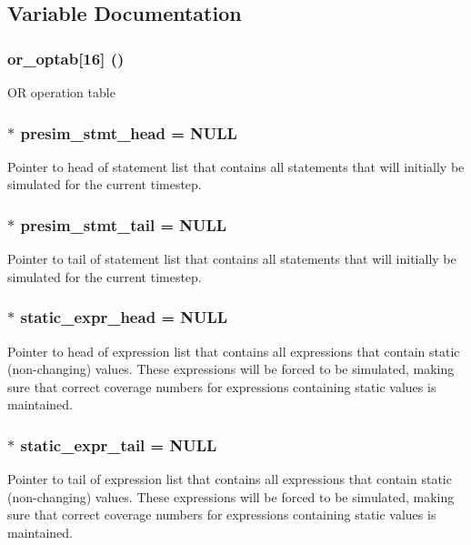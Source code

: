 \subsection{Variable Documentation}
\subsubsection{ {\bf or\_\-optab}[16] ()}\label{sim_8c_a0}


OR operation table 
\subsubsection{$\ast$ {\bf presim\_\-stmt\_\-head} = NULL}\label{sim_8c_a3}


Pointer to head of statement list that contains all statements that will initially be simulated for the current timestep. 
\subsubsection{$\ast$ {\bf presim\_\-stmt\_\-tail} = NULL}\label{sim_8c_a4}


Pointer to tail of statement list that contains all statements that will initially be simulated for the current timestep. 
\subsubsection{$\ast$ {\bf static\_\-expr\_\-head} = NULL}\label{sim_8c_a1}


Pointer to head of expression list that contains all expressions that contain static (non-changing) values. These expressions will be forced to be simulated, making sure that correct coverage numbers for expressions containing static values is maintained. 
\subsubsection{$\ast$ {\bf static\_\-expr\_\-tail} = NULL}\label{sim_8c_a2}


Pointer to tail of expression list that contains all expressions that contain static (non-changing) values. These expressions will be forced to be simulated, making sure that correct coverage numbers for expressions containing static values is maintained. 